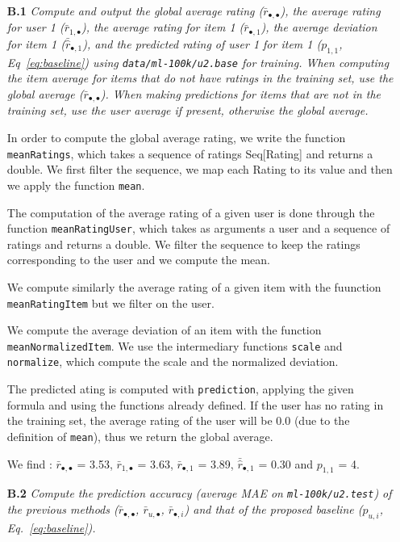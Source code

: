 \documentclass{article}
\begin{document}
\begin{itemize}
  
    \item[\textbf{B.1}] \textit{Compute and output the global average rating ($\bar r_{\bullet,\bullet}$), the average rating for user 1 ($\bar r_{1,\bullet}$),  the average rating for item 1 ($\bar r_{\bullet,1}$), the average deviation for item 1 ($\bar{\hat r}_{\bullet,1}$), and the predicted rating of user 1 for item 1 ($p_{1,1}$, Eq~\ref{eq:baseline}) using \texttt{data/ml-100k/u2.base} for training. When computing the item average for items that do not have ratings in the training set, use the global average ($\bar r_{\bullet, \bullet}$). When making predictions for items that are not in the training set, use the user average if present, otherwise the global average.}
    
    In order to compute the global average rating, we write the function \texttt{meanRatings}, which takes a sequence of ratings Seq[Rating] and returns a double. We first filter the sequence, we map each Rating to its value and then we apply the function \texttt{mean}.
    
    The computation of the average rating of a given user is done through the function \texttt{meanRatingUser}, which takes as arguments a user and a sequence of ratings and returns a double. We filter the sequence to keep the ratings corresponding to the user and we compute the mean.
    
    We compute similarly the average rating of a given item with the fuunction \texttt{meanRatingItem} but we filter on the user.
    
    We compute the average deviation of an item with the function \texttt{meanNormalizedItem}. We use the intermediary functions \texttt{scale} and \texttt{normalize}, which compute the scale and the normalized deviation. 
    
    The predicted ating is computed with \texttt{prediction}, applying the given formula and using the functions already defined. If the user has no rating in the training set, the average rating of the user will be 0.0 (due to the definition of \texttt{mean}), thus we return the global average.
    
    We find : $\bar r_{\bullet,\bullet}$ = 3.53, $\bar r_{1,\bullet}$ = 3.63, $\bar r_{\bullet,1}$ = 3.89, $\bar{\hat r}_{\bullet,1}$ = 0.30 and $p_{1,1}$ = 4.
    
    
  
    \item [\textbf{B.2}] \textit{Compute the prediction accuracy (average MAE on \texttt{ml-100k/u2.test}) of the previous methods ($\bar r_{\bullet, \bullet}$, $\bar r_{u,\bullet}$, $\bar r_{\bullet,i}$) and that of the proposed baseline ($p_{u,i}$, Eq.~\ref{eq:baseline}). }
    

\end{itemize}
\end{document}
